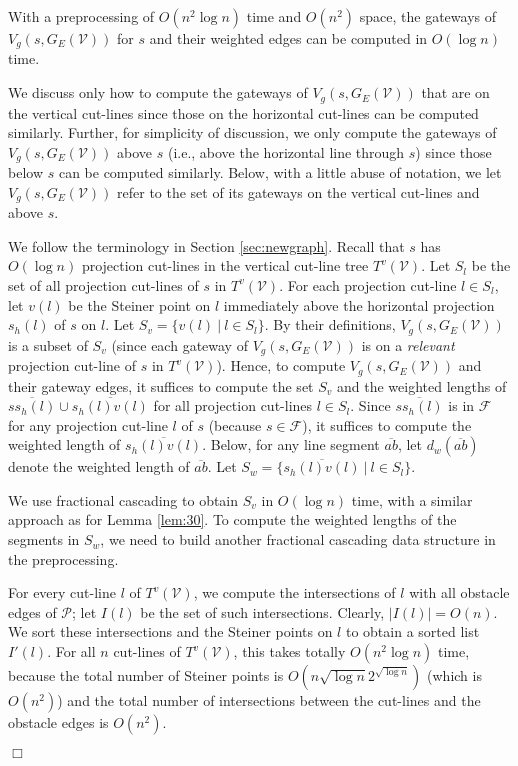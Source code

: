 \documentclass[english,runningheads,11pt]{llncs}
\def\calP{\mathcal{P}}
\def\calF{\mathcal{F}}
\def\calV{\mathcal{V}}
\newenvironment{proof}{\noindent {\textbf{Proof:}}\rm}{\hfill $\Box$\rm}
\begin{document}
\begin{lemma}\label{lem:210}
With a preprocessing of $O(n^2\log n)$ time and $O(n^2)$ space,
the gateways of $V_g(s,G_E(\calV))$ for $s$ and their weighted edges
can be computed in $O(\log n)$ time.
\end{lemma}
\begin{proof}
We discuss only how to
compute the gateways of $V_g(s,G_E(\calV))$ that are on the vertical cut-lines
since those on the horizontal cut-lines can be computed similarly.
Further, for simplicity of discussion, we only compute the gateways of
$V_g(s,G_E(\calV))$ above $s$ (i.e., above the horizontal line through $s$) since those
below $s$ can be computed similarly.
Below, with a little abuse of notation, we let $V_g(s,G_E(\calV))$ refer to the
set of its gateways on the vertical cut-lines and above $s$.



We follow the terminology in Section \ref{sec:newgraph}.
Recall that $s$ has $O(\log n)$ projection cut-lines in the vertical cut-line tree $T^v(\calV)$.
Let $S_l$ be the set of all projection cut-lines of $s$ in $T^v(\calV)$.
For each projection cut-line $l\in S_l$, let $v(l)$ be the Steiner
point on $l$ immediately above the horizontal projection $s_h(l)$ of $s$ on $l$.
Let $S_v=\{v(l)\ |\ l\in S_l\}$. By their definitions,
$V_g(s,G_E(\calV))$ is a subset of $S_v$ (since each gateway of $V_g(s,G_E(\calV))$
is on a {\it relevant} projection cut-line of $s$ in $T^v(\calV)$).
Hence, to compute $V_g(s,G_E(\calV))$ and their gateway
edges, it suffices to compute the set $S_v$ and the weighted lengths of
$\overline{ss_h(l)}\cup \overline{s_h(l)v(l)}$ for all projection cut-lines $l\in S_l$.
Since $\overline{ss_h(l)}$ is in
$\calF$ for any projection cut-line $l$ of $s$ \cite{ref:ChenSh00} (because $s\in
\calF$), it suffices to compute the weighted length of
$\overline{s_h(l)v(l)}$. Below, for any line segment $\overline{ab}$, let $d_w(\overline{ab})$
denote the weighted length of $\overline{ab}$. Let $S_w=\{\overline{s_h(l)v(l)}\ |\ l\in S_l\}$.

We use fractional cascading \cite{ref:ChazelleFr86}
to obtain $S_v$ in $O(\log n)$ time,
with a similar approach as for Lemma \ref{lem:30}.
To compute the weighted lengths of the segments in $S_w$, we need to build another fractional
cascading data structure in the preprocessing.

For every cut-line $l$ of $T^v(\calV)$, we compute the intersections of $l$ with all
obstacle edges of $\calP$; let $I(l)$ be the set of such intersections.
Clearly, $|I(l)|=O(n)$. We sort these intersections and the Steiner points on $l$ to obtain a
sorted list $I'(l)$. For all $n$ cut-lines of $T^v(\calV)$,
this takes totally $O(n^2\log n)$ time,
because the total number of Steiner points is $O(n\sqrt{\log
n}2^{\sqrt{\log n}})$ (which is $O(n^2)$) and the total number of
intersections between the cut-lines and the obstacle edges is $O(n^2)$.


\end{proof}
\end{document}
